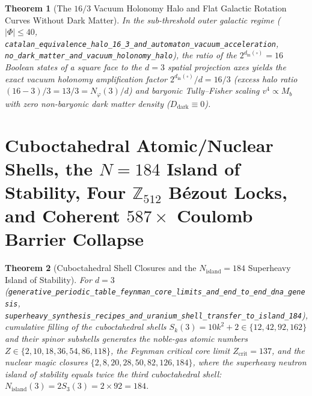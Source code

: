 \documentclass[11pt,a4paper]{article}
\theoremstyle{plain}
\newtheorem{theorem}{Theorem}[section]
\theoremstyle{definition}
\begin{document}
\begin{theorem}[The $16/3$ Vacuum Holonomy Halo and Flat Galactic Rotation Curves Without Dark Matter]
\label{thm:gravity-halo}
In the sub-threshold outer galactic regime ($|\Phi|\le 40$, \texttt{catalan\_equivalence\_halo\_16\_3\_and\_automaton\_vacuum\_acceleration}, \texttt{no\_dark\_matter\_and\_vacuum\_holonomy\_halo}), the ratio of the $2^{d_{\mathrm{in}}(\square)} = 16$ Boolean states of a square face to the $d=3$ spatial projection axes yields the exact vacuum holonomy amplification factor $2^{d_{\mathrm{in}}(\square)}/d = 16/3$ (excess halo ratio $(16-3)/3 = 13/3 = N_\varphi(3)/d$) and baryonic Tully--Fisher scaling $v^4\propto M_b$ with zero non-baryonic dark matter density ($D_{\mathrm{dark}}\equiv 0$).
\end{theorem}

\section{Cuboctahedral Atomic/Nuclear Shells, the \texorpdfstring{$N=184$}{N=184} Island of Stability, Four \texorpdfstring{$\mathbb{Z}_{512}$}{Z512} B\'ezout Locks, and Coherent \texorpdfstring{$587\times$}{587x} Coulomb Barrier Collapse}
\label{sec:nuclear-587}

\begin{theorem}[Cuboctahedral Shell Closures and the $N_{\mathrm{island}}=184$ Superheavy Island of Stability]
\label{thm:nuclear-shells-184}
For $d=3$ (\texttt{generative\_periodic\_table\_feynman\_core\_limits\_and\_end\_to\_end\_dna\_genesis}, \texttt{superheavy\_synthesis\_recipes\_and\_uranium\_shell\_transfer\_to\_island\_184}), cumulative filling of the cuboctahedral shells $S_k(3) = 10k^2 + 2 \in \{12,42,92,162\}$ and their spinor subshells generates the noble-gas atomic numbers $Z\in\{2,10,18,36,54,86,118\}$, the Feynman critical core limit $Z_{\mathrm{crit}} = 137$, and the nuclear magic closures $\{2,8,20,28,50,82,126,184\}$, where the superheavy neutron island of stability equals twice the third cuboctahedral shell: $N_{\mathrm{island}}(3) = 2S_3(3) = 2\times 92 = 184$.
\end{theorem}
\end{document}
